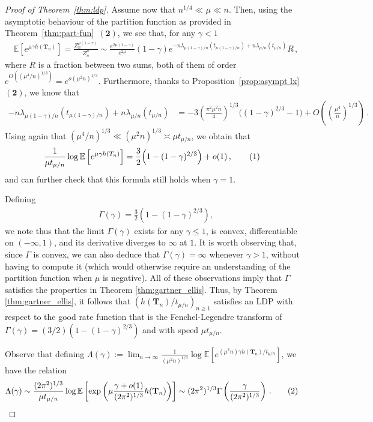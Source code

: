 \documentclass{article}
\newcommand{\E}{\mathbb{E}}								%
\newcommand{\1}{\mathbbm{1}}								%
\newcommand\numberthis{\addtocounter{equation}{1}\tag{\theequation}}
\theoremstyle{definition}
\numberwithin{equation}{section}
\newcommand{\bT}{\mathbf T}
\newcommand{\numitem}[1]{$\mathbf{(#1)}$}
\begin{document}
\begin{proof}[Proof of Theorem~\ref{thm:ldp}]
    
    Assume now that $n^{1/4}\ll\mu\ll n$.
    Then, using the asymptotic behaviour of the partition function as provided in Theorem~\ref{thm:part-fun}~\numitem{2}, we see that, for any $\gamma<1$
    \begin{align*}
        \E\left[e^{\mu\gamma h(\mathbf{T}_n)}\right]=\frac{Z_n^{\mu(1-\gamma)}}{Z_n^\mu}\sim\frac{e^{2\mu(1-\gamma)}}{e^{2\mu}}(1-\gamma)e^{-n\lambda_{\mu(1-\gamma)/n}(t_{\mu(1-\gamma)/n})+n\lambda_{\mu/n}(t_{\mu/n})}R\,,
    \end{align*}
    where $R$ is a fraction between two sums, both of them of order $e^{O((\mu^4/n)^{1/3})}=e^{o(\mu^2n)^{1/3}}$.
    Furthermore, thanks to Proposition~\ref{prop:asympt lx}~\numitem{2}, we know that
    \begin{align*}
        -n\lambda_{\mu(1-\gamma)/n}(t_{\mu(1-\gamma)/n})+n\lambda_{\mu/n}(t_{\mu/n})&=-3\left(\frac{\pi^2\mu^2n}{4}\right)^{1/3}\Big((1-\gamma)^{2/3}-1\Big)+O\left(\left(\frac{\mu^4}{n}\right)^{1/3}\right)\,.
    \end{align*}
    Using again that $(\mu^4/n)^{1/3}\ll(\mu^2n)^{1/3}\asymp \mu t_{\mu/n}$, we obtain that
    \begin{align*}
        \frac{1}{\mu t_{\mu/n}}\log\E\left[e^{\mu\gamma h(T_n)}\right]&=\frac{3}{2}\Big(1-(1-\gamma)^{2/3}\Big)+o(1)\,,\numberthis \label{eq:def_Gamma}
    \end{align*}
    and can further check that this formula still holds when $\gamma=1$.
    
    
    Defining
    \begin{align*}
        \Gamma(\gamma)=\frac{3}{2}\left(1-(1-\gamma)^{2/3}\right),
    \end{align*}
    we note thus that the limit $\Gamma(\gamma)$ exists for any $\gamma\leq1$, is convex, differentiable on $(-\infty,1)$, and its derivative diverges to $\infty$ at $1$. It is worth observing that, since $\Gamma$ is convex, we can also deduce that $\Gamma(\gamma)=\infty$ whenever $\gamma>1$, without having to compute it (which would otherwise require an understanding of the partition function when $\mu$ is negative).    
    All of these observations imply that $\Gamma$ satisfies the properties in Theorem \ref{thm:gartner_ellis}. Thus, by Theorem \ref{thm:gartner_ellis}, it follows that $(h(\mathbf{T}_n)/t_{\mu/n})_{n \geq 1}$ satisfies an LDP with respect to the good rate function that is the Fenchel-Legendre transform of $\Gamma(\gamma)=(3/2)(1-(1-\gamma)^{2/3})$ and with speed $\mu t_{\mu/n}$.

Observe that defining $\Lambda(\gamma):=\lim_{n \to \infty}\frac{1}{(\mu^2n)^{1/3}}\log\E\left[e^{(\mu^2n)\gamma h(\bT_n)/t_{\mu/n}}\right]$, we have the relation
    \begin{align*}
        \Lambda(\gamma)
        &\sim\frac{(2\pi^2)^{1/3}}{\mu t_{\mu/n}}\log\E\left[\exp\left(\mu\frac{\gamma+o(1)}{(2\pi^2)^{1/3}}h(\bT_n)\right)\right]\sim(2\pi^2)^{1/3}\Gamma\left(\frac{\gamma}{(2\pi^2)^{1/3}}\right)\,. \numberthis \label{eq:rel_lambda_gamma}
    \end{align*}
    

\end{proof}
\end{document}
